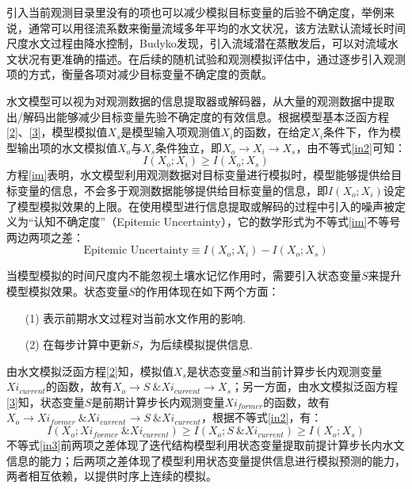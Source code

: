 引入当前观测目录里没有的项也可以减少模拟目标变量的后验不确定度，举例来说，通常可以用径流系数来衡量流域多年平均的水文状况，该方法默认流域长时间尺度水文过程由降水控制，Budyko发现，引入流域潜在蒸散发后，可以对流域水文状况有更准确的描述。在后续的随机试验和观测模拟评估中，通过逐步引入观测项的方式，衡量各项对减少目标变量不确定度的贡献。

水文模型可以视为对观测数据的信息提取器或解码器，从大量的观测数据中提取出/解码出能够减少目标变量先验不确定度的有效信息。根据模型基本泛函方程\ref{2}、\ref{3}，模型模拟值$X_s$是模型输入项观测值$X_i$的函数，在给定$X_i$条件下，作为模型输出项的水文模拟值$X_o$与$X_s$条件独立，即$X_o \to X_i \to X_s$，由不等式\ref{in2}可知：
\begin{equation}
I(X_o;X_i) \geq I(X_o;X_s)
\label{im}
\end{equation}
方程\ref{im}表明，水文模型利用观测数据对目标变量进行模拟时，模型能够提供给目标变量的信息，不会多于观测数据能够提供给目标变量的信息，即$I(X_o;X_i)$设定了模型模拟效果的上限。在使用模型进行信息提取或解码的过程中引入的噪声被定义为``认知不确定度''（Epitemic Uncertainty），它的数学形式为不等式\ref{im}不等号两边两项之差：
\begin{equation}
\text{Epitemic Uncertainty}\equiv I(X_{o};X_{i})-I(X_{o};X_{s})
\end{equation}

当模型模拟的时间尺度内不能忽视土壤水记忆作用时，需要引入状态变量$S$来提升模型模拟效果。状态变量$S$的作用体现在如下两个方面：
\begin{itemize}
\item[(1)]表示前期水文过程对当前水文作用的影响.
\item[(2)]在每步计算中更新$S$，为后续模拟提供信息.
\end{itemize}

由水文模拟泛函方程\ref{2}知，模拟值$X_s$是状态变量$S$和当前计算步长内观测变量$Xi_{current}$的函数，故有$X_o \to S ~ \& Xi_{current} \to X_s$；另一方面，由水文模拟泛函方程\ref{3}知，状态变量$S$是前期计算步长内观测变量$Xi_{former}$的函数，故有$X_o \to Xi_{former} ~ \& Xi_{current}  \to S ~ \& Xi_{current} $，根据不等式\ref{in2}，有：
\begin{equation}
\label{in3}
I(X_o;Xi_{former} ~ \& Xi_{current}) \geq I(X_o;S ~ \& Xi_{current}) \geq 
I(X_{o};X_{s})
\end{equation}
不等式\ref{in3}前两项之差体现了迭代结构模型利用状态变量提取前提计算步长内水文信息的能力；后两项之差体现了模型利用状态变量提供信息进行模拟预测的能力，两者相互依赖，以提供时序上连续的模拟。

